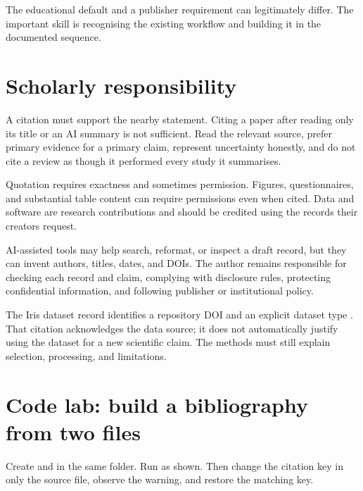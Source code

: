 The educational default and a publisher requirement can legitimately differ.
The important skill is recognising the existing workflow and building it in
the documented sequence.

\section{Scholarly responsibility}

A citation must support the nearby statement. Citing a paper after reading only
its title or an AI summary is not sufficient. Read the relevant source, prefer
primary evidence for a primary claim, represent uncertainty honestly, and do
not cite a review as though it performed every study it summarises.

Quotation requires exactness and sometimes permission. Figures, questionnaires,
and substantial table content can require permissions even when cited. Data
and software are research contributions and should be credited using the
records their creators request.

AI-assisted tools may help search, reformat, or inspect a draft record, but they
can invent authors, titles, dates, and DOIs. The author remains responsible for
checking each record and claim, complying with disclosure rules, protecting
confidential information, and following publisher or institutional policy.

\begin{scienceinpractice}
The Iris dataset record identifies a repository DOI and an explicit dataset
type \parencite{fisherIris}. That citation acknowledges the data source; it
does not automatically justify using the dataset for a new scientific claim.
The methods must still explain selection, processing, and limitations.
\end{scienceinpractice}

\section{Code lab: build a bibliography from two files}

\begin{codelab}
Create  and  in the same folder. Run
 as shown. Then change the citation key in only the source file,
observe the warning, and restore the matching key.
\end{codelab}


